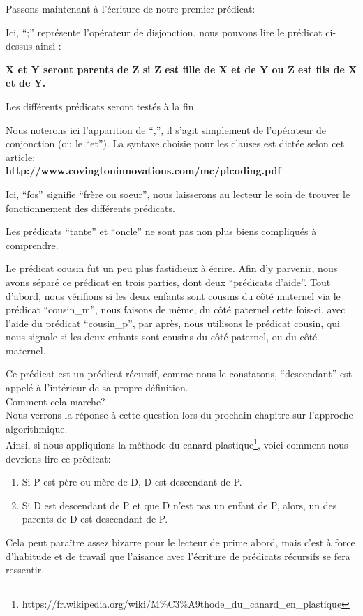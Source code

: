 \documentclass[a4paper, 12pt]{article}
\numberwithin{equation}{subsection}
\begin{document}
Passons maintenant à l'écriture de notre premier prédicat:

Ici, ``;'' représente l'opérateur de disjonction, nous pouvons lire le prédicat ci-dessus ainsi :
\begin{center}
  {\bf X et Y seront parents de Z si Z est fille de X et de Y ou Z est fils de X et de Y.}
\end{center}
Les différents prédicats seront testés à la fin.

Nous noterons ici l'apparition de ``,'', il s'agit simplement de l'opérateur de conjonction (ou le ``et''). La syntaxe choisie pour les clauses est dictée selon cet article: \\
{\bf http://www.covingtoninnovations.com/mc/plcoding.pdf}

Ici, ``fos'' signifie ``frère ou soeur'', nous laisserons au lecteur le soin de trouver le fonctionnement des différents prédicats.

Les prédicats ``tante'' et ``oncle'' ne sont pas non plus biens compliqués à comprendre.

Le prédicat cousin fut un peu plus fastidieux à écrire. Afin d'y parvenir, nous avons séparé ce prédicat en trois parties, dont deux ``prédicats d'aide''. Tout d'abord, nous vérifions si les deux enfants sont cousins du côté maternel via le prédicat ``cousin\_m'', nous faisons de même, du côté paternel cette fois-ci, avec l'aide du prédicat ``cousin\_p'', par après, nous utilisons le prédicat cousin, qui nous signale si les deux enfants sont cousins du côté paternel, ou du côté maternel.

Ce prédicat est un prédicat récursif, comme nous le constatons, ``descendant'' est appelé à l'intérieur de sa propre définition. \\ Comment cela marche? \\
Nous verrons la réponse à cette question lors du prochain chapitre sur l'approche algorithmique. \\

Ainsi, si nous appliquions la méthode du canard plastique\footnote{https://fr.wikipedia.org/wiki/M\%C3\%A9thode\_du\_canard\_en\_plastique}, voici comment nous devrions lire ce prédicat: \\
\begin{enumerate}
  \item Si P est père ou mère de D, D est descendant de P.
  \item Si D est descendant de P et que D n'est pas un enfant de P, alors, un des parents de D est descendant de P.
\end{enumerate}
Cela peut paraître assez bizarre pour le lecteur de prime abord, mais c'est à force d'habitude et de travail que l'aisance avec l'écriture de prédicats récursifs se fera ressentir.\\
\end{document}
